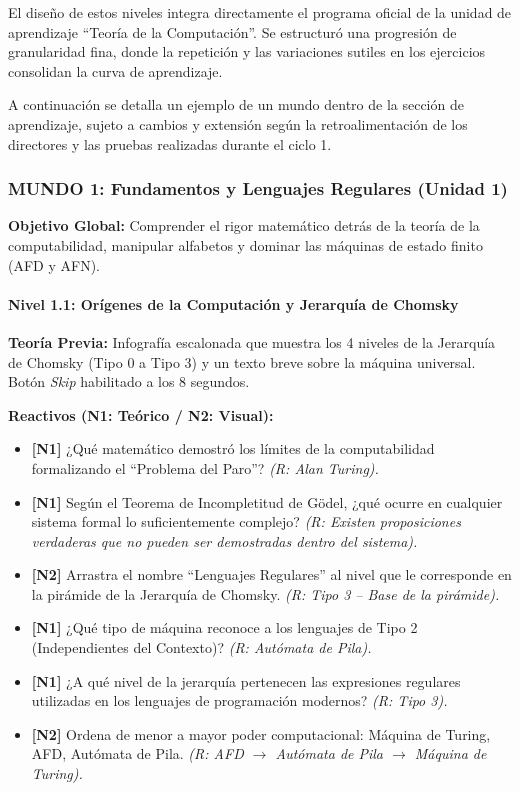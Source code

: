 El diseño de estos niveles integra directamente el programa oficial de la unidad de aprendizaje
``Teoría de la Computación''. Se estructuró una progresión de granularidad fina, donde la
repetición y las variaciones sutiles en los ejercicios consolidan la curva de aprendizaje.

A continuación se detalla un ejemplo de un mundo dentro de la sección de aprendizaje, sujeto a
cambios y extensión según la retroalimentación de los directores y las pruebas realizadas durante
el ciclo 1.

\subsubsection*{MUNDO 1: Fundamentos y Lenguajes Regulares (Unidad 1)}

\textbf{Objetivo Global:} Comprender el rigor matemático detrás de la teoría de la computabilidad,
manipular alfabetos y dominar las máquinas de estado finito (AFD y AFN).

\paragraph{Nivel 1.1: Orígenes de la Computación y Jerarquía de Chomsky}

\textbf{Teoría Previa:} Infografía escalonada que muestra los 4 niveles de la Jerarquía de Chomsky
(Tipo 0 a Tipo 3) y un texto breve sobre la máquina universal. Botón \textit{Skip} habilitado a
los 8 segundos.

\textbf{Reactivos (N1: Teórico / N2: Visual):}
\begin{itemize}
    \item \textbf{[N1]} ¿Qué matemático demostró los límites de la computabilidad formalizando el
    ``Problema del Paro''? \textit{(R: Alan Turing).}
    \item \textbf{[N1]} Según el Teorema de Incompletitud de Gödel, ¿qué ocurre en cualquier
    sistema formal lo suficientemente complejo? \textit{(R: Existen proposiciones verdaderas que no
    pueden ser demostradas dentro del sistema).}
    \item \textbf{[N2]} Arrastra el nombre ``Lenguajes Regulares'' al nivel que le corresponde en
    la pirámide de la Jerarquía de Chomsky. \textit{(R: Tipo 3 -- Base de la pirámide).}
    \item \textbf{[N1]} ¿Qué tipo de máquina reconoce a los lenguajes de Tipo 2 (Independientes
    del Contexto)? \textit{(R: Autómata de Pila).}
    \item \textbf{[N1]} ¿A qué nivel de la jerarquía pertenecen las expresiones regulares
    utilizadas en los lenguajes de programación modernos? \textit{(R: Tipo 3).}
    \item \textbf{[N2]} Ordena de menor a mayor poder computacional: Máquina de Turing, AFD,
    Autómata de Pila. \textit{(R: AFD $\rightarrow$ Autómata de Pila $\rightarrow$ Máquina de
    Turing).}
\end{itemize}


